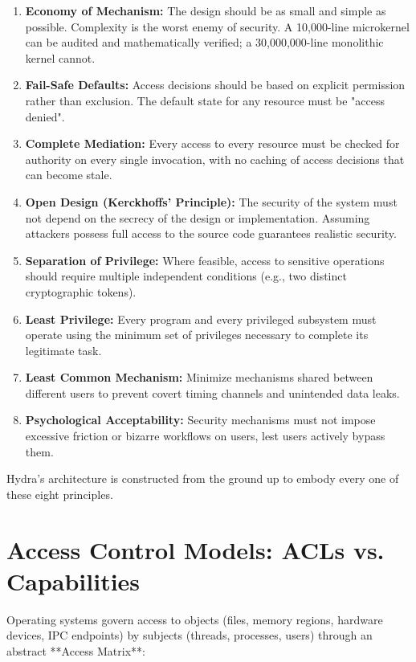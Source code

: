 \begin{enumerate}
    \item \textbf{Economy of Mechanism:} The design should be as small and simple as possible. Complexity is the worst enemy of security. A 10,000-line microkernel can be audited and mathematically verified; a 30,000,000-line monolithic kernel cannot.
    \item \textbf{Fail-Safe Defaults:} Access decisions should be based on explicit permission rather than exclusion. The default state for any resource must be "access denied".
    \item \textbf{Complete Mediation:} Every access to every resource must be checked for authority on every single invocation, with no caching of access decisions that can become stale.
    \item \textbf{Open Design (Kerckhoffs' Principle):} The security of the system must not depend on the secrecy of the design or implementation. Assuming attackers possess full access to the source code guarantees realistic security.
    \item \textbf{Separation of Privilege:} Where feasible, access to sensitive operations should require multiple independent conditions (e.g., two distinct cryptographic tokens).
    \item \textbf{Least Privilege:} Every program and every privileged subsystem must operate using the minimum set of privileges necessary to complete its legitimate task.
    \item \textbf{Least Common Mechanism:} Minimize mechanisms shared between different users to prevent covert timing channels and unintended data leaks.
    \item \textbf{Psychological Acceptability:} Security mechanisms must not impose excessive friction or bizarre workflows on users, lest users actively bypass them.
\end{enumerate}

Hydra's architecture is constructed from the ground up to embody every one of these eight principles.

\section{Access Control Models: ACLs vs. Capabilities}
\label{sec:access_control_models}

Operating systems govern access to objects (files, memory regions, hardware devices, IPC endpoints) by subjects (threads, processes, users) through an abstract **Access Matrix**:

